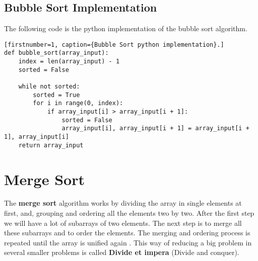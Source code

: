 \subsection{Bubble Sort Implementation}
The following code is the python implementation of the bubble sort algorithm.
\begin{lstlisting}[firstnumber=1, caption={Bubble Sort python implementation}.]
def bubble_sort(array_input):
	index = len(array_input) - 1
	sorted = False
	
	while not sorted:
		sorted = True
		for i in range(0, index):
			if array_input[i] > array_input[i + 1]:
				sorted = False
				array_input[i], array_input[i + 1] = array_input[i + 1], array_input[i]
	return array_input
\end{lstlisting}

\section{Merge Sort}
The \textbf{merge sort} algorithm works by dividing the array in single elements at first, and, grouping and ordering all the elements two by two. After the first step we will have a lot of subarrays of two elements. The next step is to merge all these subarrays and to order the elements. The merging and ordering process is repeated until the array is unified again \cite{wikimergesort}. This way of reducing a big problem in several smaller problems is called \textbf{Divide et impera} (Divide and conquer).

